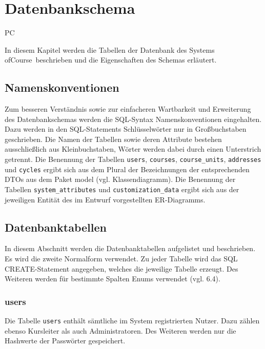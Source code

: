 \chapter{Datenbankschema}

\begin{tiny}
PC
\end{tiny}

In diesem Kapitel werden die Tabellen der Datenbank des Systems \grqq ofCourse\grqq\ beschrieben und die Eigenschaften des Schemas erläutert.

\section{Namenskonventionen}
Zum besseren Verständnis sowie zur einfacheren Wartbarkeit und Erweiterung des Datenbankschemas werden die SQL-Syntax Namenskonventionen eingehalten. Dazu werden in den SQL-Statements Schlüsselwörter nur in Großbuchstaben geschrieben. Die Namen der Tabellen sowie deren Attribute bestehen ausschließlich aus Kleinbuchstaben, Wörter werden dabei durch einen Unterstrich getrennt. Die Benennung der Tabellen \texttt{users}, \texttt{courses}, \texttt{course\_units}, \texttt{addresses} und \texttt{cycles} ergibt sich aus dem Plural der Bezeichnungen der entsprechenden DTOs aus dem Paket model (vgl. Klassendiagramm). Die Benennung der Tabellen \texttt{system\_attributes} und \texttt{customization\_data} ergibt sich aus der jeweiligen Entität des im Entwurf vorgestellten ER-Diagramms.

\section{Datenbanktabellen}
In diesem Abschnitt werden die Datenbanktabellen aufgelistet und beschrieben. Es wird die zweite Normalform verwendet. Zu jeder Tabelle wird das SQL CREATE-Statement angegeben, welches die jeweilige Tabelle erzeugt. Des Weiteren werden für bestimmte Spalten Enums verwendet (vgl. 6.4).

\subsection{users}
Die Tabelle \texttt{users} enthält sämtliche im System registrierten Nutzer. Dazu zählen ebenso Kursleiter als auch Administratoren. Des Weiteren werden nur die Hashwerte der Passwörter gespeichert.
	
